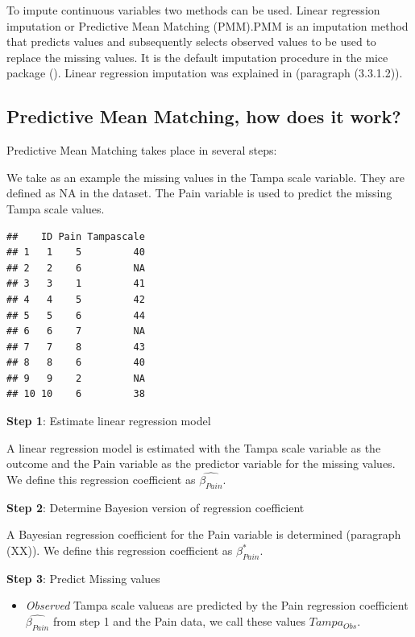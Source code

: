 \documentclass[]{book}
\providecommand{\tightlist}{%
  \setlength{\itemsep}{0pt}\setlength{\parskip}{0pt}}
\theoremstyle{definition}
\theoremstyle{definition}
\theoremstyle{definition}
\theoremstyle{remark}
\begin{document}
To impute continuous variables two methods can be used. Linear
regression imputation or Predictive Mean Matching (PMM).PMM is an
imputation method that predicts values and subsequently selects observed
values to be used to replace the missing values. It is the default
imputation procedure in the mice package (\citet{rubin1987}). Linear
regression imputation was explained in (paragraph (3.3.1.2)).

\subsection{Predictive Mean Matching, how does it
work?}\label{predictive-mean-matching-how-does-it-work}

Predictive Mean Matching takes place in several steps:

We take as an example the missing values in the Tampa scale variable.
They are defined as NA in the dataset. The Pain variable is used to
predict the missing Tampa scale values.

\begin{verbatim}
##    ID Pain Tampascale
## 1   1    5         40
## 2   2    6         NA
## 3   3    1         41
## 4   4    5         42
## 5   5    6         44
## 6   6    7         NA
## 7   7    8         43
## 8   8    6         40
## 9   9    2         NA
## 10 10    6         38
\end{verbatim}

\textbf{Step 1}: Estimate linear regression model

A linear regression model is estimated with the Tampa scale variable as
the outcome and the Pain variable as the predictor variable for the
missing values. We define this regression coefficient as
\(\hat{\beta_{Pain}}\).

\textbf{Step 2}: Determine Bayesion version of regression coefficient

A Bayesian regression coefficient for the Pain variable is determined
(paragraph (XX)). We define this regression coefficient as
\(\beta_{Pain}^*\).

\textbf{Step 3}: Predict Missing values

\begin{itemize}
\tightlist
\item
  \emph{Observed} Tampa scale valueas are predicted by the Pain
  regression coefficient \(\hat{\beta_{Pain}}\) from step 1 and the Pain
  data, we call these values \(Tampa_{Obs}\).
\end{itemize}
\end{document}
